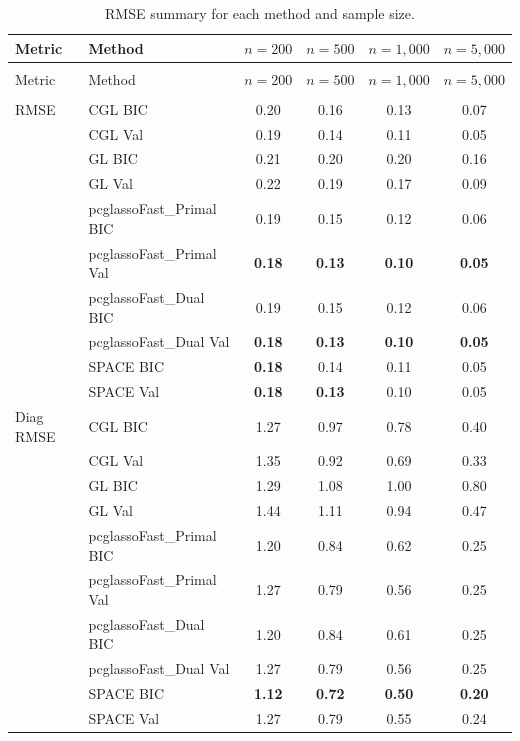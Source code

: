 \documentclass[12pt]{amsart}
\numberwithin{equation}{section}
\numberwithin{equation}{section}
\theoremstyle{plain}
\theoremstyle{definition}
\begin{document}
\begin{longtable}[]{@{}llcccc@{}}
\caption{RMSE summary for each method and sample size.\label{tab:nonhubrmse}}\\
\toprule\noalign{}
Metric & Method & $n=200$ & $n=500$ & $n=1,000$ & $n=5,000$ \\
\midrule\noalign{}
\endfirsthead

\multicolumn{6}{c}{{\tablename\ \thetable{} -- continued from previous page}} \\
\toprule\noalign{}
Metric & Method & $n=200$ & $n=500$ & $n=1,000$ & $n=5,000$ \\
\midrule\noalign{}
\endhead

\midrule \multicolumn{6}{r}{{Continued on next page}} \\
\endfoot

\bottomrule
\endlastfoot

RMSE & CGL BIC & 0.20 & 0.16 & 0.13 & 0.07 \\
 & CGL Val & 0.19 & 0.14 & 0.11 & 0.05 \\
 & GL BIC & 0.21 & 0.20 & 0.20 & 0.16 \\
 & GL Val & 0.22 & 0.19 & 0.17 & 0.09 \\
 & pcglassoFast\_Primal BIC & 0.19 & 0.15 & 0.12 & 0.06 \\
 & pcglassoFast\_Primal Val & \textbf{0.18} & \textbf{0.13} & \textbf{0.10} & \textbf{0.05} \\
 & pcglassoFast\_Dual BIC & 0.19 & 0.15 & 0.12 & 0.06 \\
 & pcglassoFast\_Dual Val & \textbf{0.18} & \textbf{0.13} & \textbf{0.10} & \textbf{0.05} \\
 & SPACE BIC & \textbf{0.18} & 0.14 & 0.11 & 0.05 \\
 & SPACE Val & \textbf{0.18} & \textbf{0.13} & 0.10 & 0.05 \\

\midrule\noalign{}
Diag RMSE & CGL BIC & 1.27 & 0.97 & 0.78 & 0.40 \\
 & CGL Val & 1.35 & 0.92 & 0.69 & 0.33 \\
 & GL BIC & 1.29 & 1.08 & 1.00 & 0.80 \\
 & GL Val & 1.44 & 1.11 & 0.94 & 0.47 \\
 & pcglassoFast\_Primal BIC & 1.20 & 0.84 & 0.62 & 0.25 \\
 & pcglassoFast\_Primal Val & 1.27 & 0.79 & 0.56 & 0.25 \\
 & pcglassoFast\_Dual BIC & 1.20 & 0.84 & 0.61 & 0.25 \\
 & pcglassoFast\_Dual Val & 1.27 & 0.79 & 0.56 & 0.25 \\
 & SPACE BIC & \textbf{1.12} & \textbf{0.72} & \textbf{0.50} & \textbf{0.20} \\
 & SPACE Val & 1.27 & 0.79 & 0.55 & 0.24 \\


\end{longtable}
\end{document}
